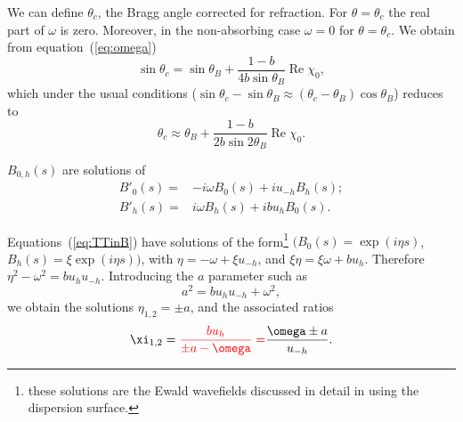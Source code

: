 \documentclass[preprint]{iucr}              %
\newcommand{\inred}[1]{{\color{red}#1}}
\begin{document}
We can define $\theta_c$, the Bragg angle corrected for refraction. For $\theta=\theta_c$ the real part of $\omega$ is zero. Moreover, in the non-absorbing case $\omega=0$ for $\theta=\theta_c$.  We obtain from equation~(\ref{eq:omega})
\begin{equation}\label{eq:correctedBraggAngleExact}
   \sin\theta_c = \sin\theta_B + \frac{1-b}{4 b \sin\theta_B} \operatorname{Re}\chi_0,   
\end{equation}
which under the usual conditions \inred{($\sin\theta_c-\sin\theta_B \approx  (\theta_c-\theta_B) \cos\theta_B$)} reduces to
\begin{equation}\label{eq:correctedBraggAngle}
   \theta_c \approx \theta_B + \frac{1-b}{2 b \sin2\theta_B} \operatorname{Re}\chi_0.  
\end{equation} 




$B_{0,h}(s)$ are solutions of 
\begin{subequations}
\label{eq:TTinB}
\begin{align}
B'_0(s) =& -i \omega B_0(s) + i u_{-h} B_h(s); \\
B'_h(s) =& i \omega B_h(s) + i b u_{h} B_0(s).
\end{align}
\end{subequations}



Equations~(\ref{eq:TTinB}) have solutions of the form\footnote{these solutions are the Ewald wavefields discussed in detail in \cite{authierbook} using the dispersion surface.} $(B_0(s)=\exp(i \eta s)$, $B_h(s)=\xi \exp(i \eta s))$, with $\eta =-\omega + \xi u_{-h}$, and $\xi \eta=\xi \omega+b u_h$. Therefore $\eta^2-\omega^2=b u_h u_{-h}$. Introducing the $a$ parameter such as
\begin{equation}\label{eq:a}
    a^2=b u_h u_{-h}+\omega^2,
\end{equation}
we obtain the solutions $\eta_{1,2}=\pm a$, and the associated ratios
\begin{equation}\label{eq:xis}
\xi_{1,2}=\inred{\frac{b u_h}{\pm a-\omega} =} \frac{\omega \pm a}{u_{-h}}.    
\end{equation}
\end{document}

